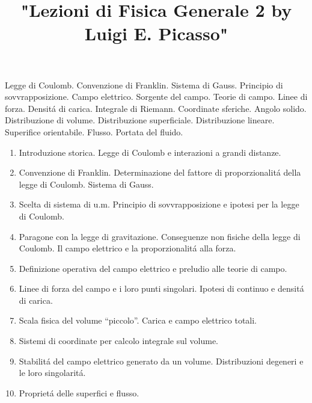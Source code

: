 

\usepackage[italian]{babel}

\title{"Lezioni di Fisica Generale 2 by Luigi E. Picasso"}


\maketitle

\begin{multicols}{3}
  Legge di Coulomb. Convenzione di Franklin. Sistema di Gauss. Principio di sovvrapposizione.
  Campo elettrico. Sorgente del campo. Teorie di campo. Linee di forza. Densit\'a di carica.
  Integrale di Riemann. Coordinate sferiche. Angolo solido. Distribuzione di volume.
  Distribuzione superficiale. Distribuzione lineare. Superifice orientabile. Flusso.
  Portata del fluido.
\end{multicols}

\begin{multicols}{3}
  \begin{enumerate}
  \item Introduzione storica. Legge di Coulomb e interazioni a grandi distanze.
  \item Convenzione di Franklin. Determinazione del fattore di proporzionalit\'a della legge di Coulomb.
    Sistema di Gauss.
  \item Scelta di sistema di u.m. Principio di sovvrapposizione e ipotesi per la legge di Coulomb.
  \item Paragone con la legge di gravitazione. Conseguenze non fisiche della legge di Coulomb. Il campo elettrico e la proporzionalit\'a alla forza.
  \item Definizione operativa del campo elettrico e preludio alle teorie di campo.
  \item Linee di forza del campo e i loro punti singolari. Ipotesi di continuo e densit\'a di carica.
  \item Scala fisica del volume ``piccolo''. Carica e campo elettrico totali.
  \item Sistemi di coordinate per calcolo integrale sul volume.
  \item Stabilit\'a del campo elettrico generato da un volume. Distribuzioni degeneri e le loro singolarit\'a.
  \item Propriet\'a delle superfici e flusso.
  \end{enumerate}
\end{multicols}

